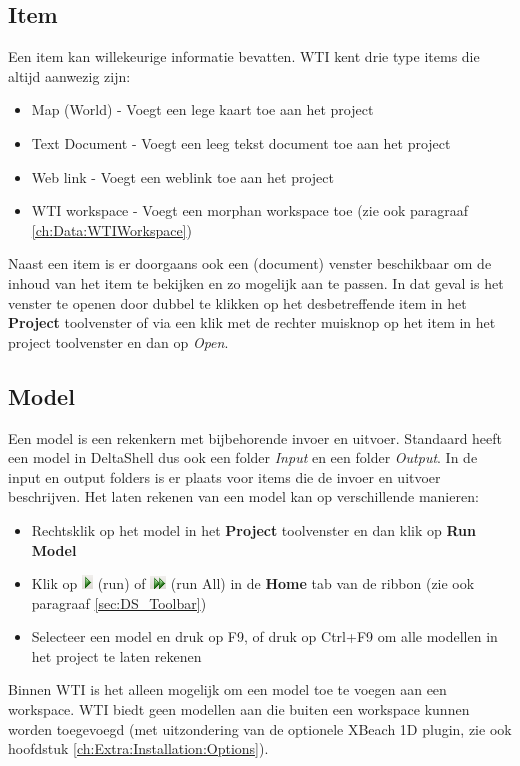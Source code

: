 \subsection{Item}
Een item kan willekeurige informatie bevatten. WTI kent drie type items die altijd aanwezig zijn:
\begin{itemize}
\item Map (World) - Voegt een lege kaart toe aan het project
\item Text Document - Voegt een leeg tekst document toe aan het project
\item Web link - Voegt een weblink toe aan het project
\item WTI workspace - Voegt een morphan workspace toe (zie ook paragraaf \ref{ch:Data:WTIWorkspace})
\end{itemize}
Naast een item is er doorgaans ook een (document) venster beschikbaar om de inhoud van het item te bekijken en zo mogelijk aan te passen. In dat geval is het venster te openen door dubbel te klikken op het desbetreffende item in het \textbf{Project} toolvenster of via een klik met de rechter muisknop op het item in het project toolvenster en dan op \textit{Open}.

\subsection{Model}
Een model is een rekenkern met bijbehorende invoer en uitvoer. Standaard heeft een model in DeltaShell dus ook een folder \textit{Input} en een folder \textit{Output}. In de input en output folders is er plaats voor items die de invoer en uitvoer beschrijven. Het laten rekenen van een model kan op verschillende manieren:
\begin{itemize}
\item Rechtsklik op het model in het \textbf{Project} toolvenster en dan klik op \textbf{Run Model}
\item Klik op \includegraphics{figures/chapter_general/Run_Arrow.png} (run) of \includegraphics{figures/chapter_general/RunAll_Arrow.png} (run All) in de \textbf{Home} tab van de ribbon (zie ook paragraaf \ref{sec:DS_Toolbar})
\item Selecteer een model en druk op F9, of druk op Ctrl+F9 om alle modellen in het project te laten rekenen
\end{itemize}
Binnen WTI is het alleen mogelijk om een model toe te voegen aan een workspace. WTI biedt geen modellen aan die buiten een workspace kunnen worden toegevoegd (met uitzondering van de optionele XBeach 1D plugin, zie ook hoofdstuk \ref{ch:Extra:Installation:Options}).

